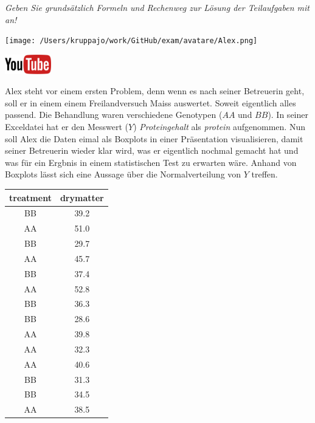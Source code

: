 \documentclass[a4paper, 9pt]{scrartcl}\usepackage[]{graphicx}\usepackage[]{xcolor}
\begin{document}
\textit{Geben Sie grundsätzlich Formeln und Rechenweg zur Lösung der Teilaufgaben mit an!} \\[1Ex]
 

 
\begin{minipage}[t]{0.5\textwidth}
\texttt{[image: /Users/kruppajo/work/GitHub/exam/avatare/Alex.png]}
\end{minipage}
\begin{minipage}[t]{0.5\textwidth}
\hfill
\href{https://youtu.be/0xc0jIPeiyw}{\includegraphics[width = 2cm]{img/youtube}}\\[1Ex]
\end{minipage}
\vspace{1ex}



Alex steht vor einem ersten Problem, denn wenn es nach seiner Betreuerin geht, soll er in einem einem Freilandversuch Maiss auswertet. Soweit eigentlich alles passend. Die Behandlung waren verschiedene Genotypen ($AA$ und $BB$). In seiner Exceldatei hat er den Messwert ($Y$) \textit{Proteingehalt} als \textit{protein} aufgenommen. Nun soll Alex die Daten eimal als Boxplots in einer Präsentation visualisieren, damit seiner Betreuerin wieder klar wird, was er eigentlich nochmal gemacht hat und was für ein Ergbnis in einem statistischen Test zu erwarten wäre. Anhand von Boxplots lässt sich eine Aussage über die Normalverteilung von $Y$ treffen.

\begin{table}[!h]
\centering
\begin{tabular}{cc}
\toprule
treatment & drymatter\\
\midrule
BB & 39.2\\
AA & 51.0\\
BB & 29.7\\
AA & 45.7\\
BB & 37.4\\
\addlinespace
AA & 52.8\\
BB & 36.3\\
BB & 28.6\\
AA & 39.8\\
AA & 32.3\\
\addlinespace
AA & 40.6\\
BB & 31.3\\
BB & 34.5\\
AA & 38.5\\
\bottomrule
\end{tabular}
\end{table}
\end{document}
